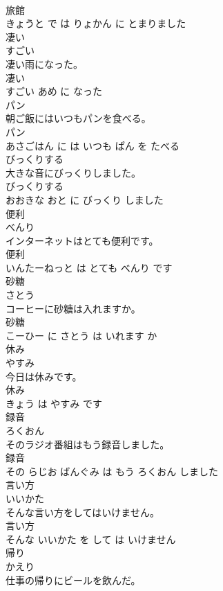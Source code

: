 \documentclass[8pt]{extreport}
\begin{document}
\begin{CJK}{UTF8}{min}
\\	旅館 
\\	きょうと で は りょかん に とまりました			
\\	凄い	
\\	すごい			
\\	凄い雨になった。	
\\	凄い 
\\	すごい あめ に なった			
\\	パン	
\\	朝ご飯にはいつもパンを食べる。	
\\	パン 
\\	あさごはん に は いつも ぱん を たべる			
\\	びっくりする	
\\	大きな音にびっくりしました。	
\\	びっくりする 
\\	おおきな おと に びっくり しました			
\\	便利	
\\	べんり			
\\	インターネットはとても便利です。	
\\	便利 
\\	いんたーねっと は とても べんり です			
\\	砂糖	
\\	さとう			
\\	コーヒーに砂糖は入れますか。	
\\	砂糖 
\\	こーひー に さとう は いれます か			
\\	休み	
\\	やすみ			
\\	今日は休みです。	
\\	休み 
\\	きょう は やすみ です			
\\	録音	
\\	ろくおん			
\\	そのラジオ番組はもう録音しました。	
\\	録音 
\\	その らじお ばんぐみ は もう ろくおん しました			
\\	言い方	
\\	いいかた			
\\	そんな言い方をしてはいけません。	
\\	言い方 
\\	そんな いいかた を して は いけません			
\\	帰り	
\\	かえり			
\\	仕事の帰りにビールを飲んだ。	

\end{CJK}
\end{document}
